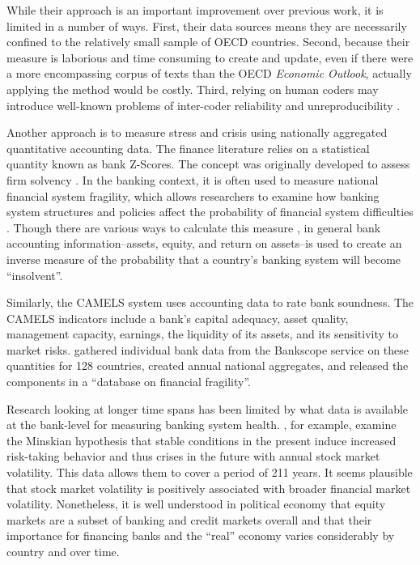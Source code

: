 \documentclass[]{article}
\begin{document}
While their approach is an important improvement over previous work, it is limited in a number of ways. First, their data sources means they are necessarily confined to the relatively small sample of OECD countries. Second, because their measure is laborious and time consuming to create and update, even if there were a more encompassing corpus of texts than the OECD \emph{Economic Outlook}, actually applying the method would be costly. Third, relying on human coders may introduce well-known problems of inter-coder reliability and unreproducibility \citep{Minhas2015}.

Another approach is to measure stress and crisis using nationally aggregated quantitative accounting data. The finance literature relies on a statistical quantity known as bank Z-Scores. The concept was originally developed to assess firm solvency \citep[see][]{roy1952}. In the banking context, it is often used to measure national financial system fragility, which allows researchers to examine how banking system structures and policies affect the probability of financial system difficulties \citep[e.g.][]{beck2013bank,vcihak2010islamic,laeven2009bank,uhde2009}. Though there are various ways to calculate this measure \citep[73]{Lepetit2013}, in general bank accounting information--assets, equity, and return on assets--is used to create an inverse measure of the probability that a country's banking system will become ``insolvent''.

Similarly, the CAMELS system uses accounting data to rate bank soundness. The CAMELS indicators include a bank's capital adequacy, asset quality, management capacity, earnings, the liquidity of its assets, and its sensitivity to market risks. \cite{Andrianova2015} gathered individual bank data from the Bankscope service on these quantities for 128 countries, created annual national aggregates, and released the components in a ``database on financial fragility''.

Research looking at longer time spans has been limited by what data is available at the bank-level for measuring banking system health. \cite{Danielsson2015}, for example, examine the Minskian \citeyearpar{Minsky1982} hypothesis that stable conditions in the present induce increased risk-taking behavior and thus crises in the future with annual stock market volatility. This data allows them to cover a period of 211 years. It seems plausible that stock market volatility is positively associated with broader financial market volatility. Nonetheless, it is well understood in political economy \citep[seminally][]{hall2001introduction} that equity markets are a subset of banking and credit markets overall and that their importance for financing banks and the ``real'' economy varies considerably by country and over time.
\end{document}
